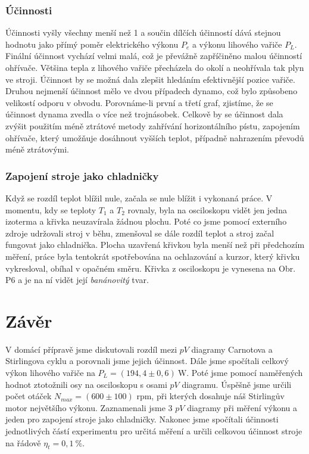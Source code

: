 \documentclass[english]{article}
\newcommand{\unit}[1]{\mathrm{#1}}
\begin{document}
	\subsubsection{Účinnosti}		
		Účinnosti vyšly všechny menší než 1 a součin dílčích účinností dává stejnou hodnotu jako přímý poměr elektrického výkonu $P_e$ a výkonu lihového vařiče $P_L$. Finální účinnost vychází velmi malá, což je převážně zapříčiněno malou účinností ohřívače. Většina tepla z lihového vařiče přecházela do okolí a neohřívala tak plyn ve stroji. Účinnost by se možná dala zlepšit hledáním efektivnější pozice vařiče. Druhou nejmenší účinnost mělo ve dvou případech dynamo, což bylo způsobeno velikostí odporu v obvodu. Porovnáme-li první a třetí graf, zjistíme, že se účinnost dynama zvedla o více než trojnásobek. Celkově by se účinnost dala zvýšit použitím méně ztrátové metody zahřívání horizontálního pístu, zapojením ohřívače, který umožňuje dosáhnout vyšších teplot, případně nahrazením převodů méně ztrátovými. 
		
	\subsubsection{Zapojení stroje jako chladničky}	
		Když se rozdíl teplot blížil nule, začala se nule blížit i vykonaná práce. V momentu, kdy se teploty $T_1$ a $T_2$ rovnaly, byla na osciloskopu vidět jen jedna izoterma a křivka neuzavírala žádnou plochu. Poté co jsme pomocí externího zdroje udržovali stroj v běhu, zmenšoval se dále rozdíl teplot a stroj začal fungovat jako chladnička. Plocha uzavřená křivkou byla menší než při předchozím měření, práce byla tentokrát spotřebována na ochlazování a kurzor, který křivku vykresloval, obíhal v opačném směru. Křivka z osciloskopu je vynesena na Obr. P6 a je na ní vidět její \emph{banánovitý} tvar. 
		
\section{Závěr}
	V domácí přípravě jsme diskutovali rozdíl mezi $pV$ diagramy Carnotova a Stirlingova cyklu a porovnali jsme jejich účinnost. Dále jsme spočítali celkový výkon lihového vařiče na $P_L = (194,4 \pm 0,6)\ \unit{W}$. Poté jsme pomocí naměřených hodnot ztotožnili osy na osciloskopu s osami $pV$ diagramu. Úspěšně jsme určili počet otáček $N_{max} = (600 \pm 100)$ rpm, při kterých dosahuje náš Stirlingův motor největšího výkonu. Zaznamenali jsme 3 $pV$ diagramy při měření výkonu a jeden pro zapojení stroje jako chladničky. Nakonec jsme spočítali účinnosti jednotlivých částí experimentu pro určitá měření a určili celkovou účinnost stroje na řádově $\eta_t = 0,1\ \%$.
\end{document}
